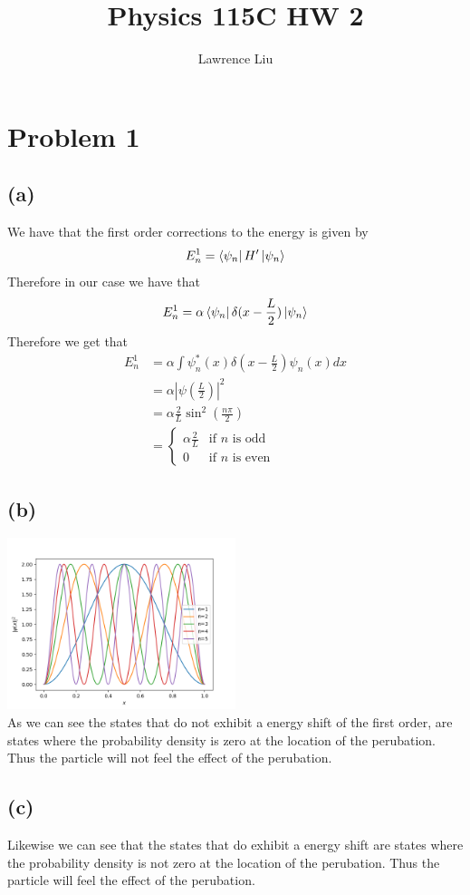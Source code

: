 \documentclass[11pt]{article}
\author{Lawrence Liu}
\title{Physics 115C HW 2}
\begin{document}
\maketitle
\section*{Problem 1}
\subsection*{(a)}
We have that the first order corrections to the energy is given by 
$$
E_{n}^{1}=\bra{\psi_n}H'\ket{\psi_n}
$$
Therefore in our case we have that 
$$
    E_{n}^{1}=\alpha\bra{\psi_n}\delta(x-\frac{L}{2})\ket{\psi_n}
$$
Therefore we get that 
\begin{align*}
    E_{n}^{1}&=\alpha\int
    \psi_n^*(x) \delta(x-\frac{L}{2})\psi_n(x)dx\\
    &=\alpha |\psi(\frac{L}{2})|^2 \\
    &= \alpha \frac{2}{L} \sin^2\left(\frac{n\pi}{2}\right)\\
    &=\begin{cases}
    \alpha \frac{2}{L} & \text{if $n$ is odd}\\
    0 & \text{if $n$ is even}
    \end{cases}
\end{align*}
\subsection*{(b)}
\includegraphics*[width=0.5\textwidth]{wavefunction.png}\\
As we can see the states that do not exhibit a energy 
shift of the first order, are states where the probability
density is zero at the location of the perubation. Thus the 
particle will not feel the effect of the perubation.
\subsection*{(c)}
Likewise we can see that the states that do exhibit a energy
shift are states where the probability density is not zero at the
location of the perubation. Thus the particle will feel the effect
of the perubation.
\end{document}
